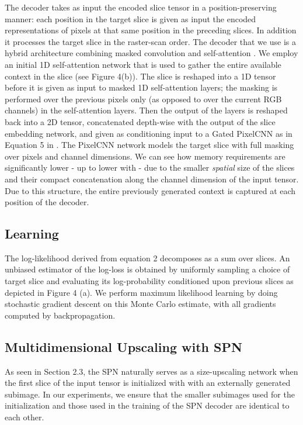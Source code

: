 \documentclass{article} \usepackage{iclr2019_conference,times}
\begin{document}
The decoder takes as input the encoded slice tensor  in a position-preserving manner: each position in the target slice is given as input the encoded representations of pixels at that same position in the preceding slices. In addition it processes the target slice in the raster-scan order. The decoder that we use is a hybrid architecture combining masked convolution and self-attention \citep{pixelsnail}. We employ an initial 1D self-attention network \cite{Vaswani17} that is used to gather the entire available context in the slice (see Figure 4(b)). The slice is reshaped into a 1D tensor before it is given as input to masked 1D self-attention layers; the masking is performed over the previous pixels only (as opposed to over the current RGB channels) in the self-attention layers. Then the output of the layers is reshaped back into a 2D tensor, concatenated depth-wise with the output of the slice embedding network, and given as conditioning input to a Gated PixelCNN as in Equation 5 in \citet{gatedpix}. The PixelCNN network models the target slice with full masking over pixels and channel dimensions. We can see how memory requirements are significantly lower - up to  lower with  - due to the smaller {\it spatial} size of the slices and their compact concatenation along the channel dimension of the input tensor. Due to this structure, the entire previously generated context is captured at each position of the decoder.
\vspace{-0.2cm}

\subsection{Learning}

The log-likelihood derived from equation 2 decomposes as a sum over slices. An unbiased estimator of the log-loss is obtained by uniformly sampling a choice of target slice and evaluating its log-probability conditioned upon previous slices as depicted in Figure 4 (a). We perform maximum likelihood learning by doing stochastic gradient descent on this Monte Carlo estimate, with all gradients computed by backpropagation. 


\subsection{Multidimensional Upscaling with SPN}

As seen in Section 2.3, the SPN naturally serves as a size-upscaling network when the first slice of the input tensor is initialized with with an externally generated subimage. In our experiments, we ensure that the smaller subimages used for the initialization and those used in the training of the SPN decoder are identical to each other. 
\end{document}
